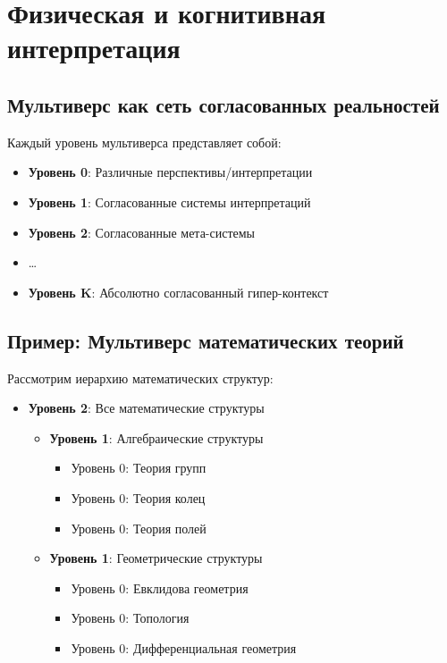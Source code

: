 \documentclass[12pt,a4paper]{article}
\begin{document}
\section{Физическая и когнитивная интерпретация}

\subsection{Мультиверс как сеть согласованных реальностей}

Каждый уровень мультиверса представляет собой:
\begin{itemize}
    \item \textbf{Уровень 0}: Различные перспективы/интерпретации
    \item \textbf{Уровень 1}: Согласованные системы интерпретаций
    \item \textbf{Уровень 2}: Согласованные мета-системы
    \item \ldots
    \item \textbf{Уровень K}: Абсолютно согласованный гипер-контекст
\end{itemize}

\subsection{Пример: Мультиверс математических теорий}

Рассмотрим иерархию математических структур:
\begin{itemize}
    \item \textbf{Уровень 2}: Все математические структуры
    \begin{itemize}
        \item \textbf{Уровень 1}: Алгебраические структуры
        \begin{itemize}
            \item Уровень 0: Теория групп
            \item Уровень 0: Теория колец
            \item Уровень 0: Теория полей
        \end{itemize}
        \item \textbf{Уровень 1}: Геометрические структуры
        \begin{itemize}
            \item Уровень 0: Евклидова геометрия
            \item Уровень 0: Топология
            \item Уровень 0: Дифференциальная геометрия
        \end{itemize}
    \end{itemize}
\end{itemize}
\end{document}
